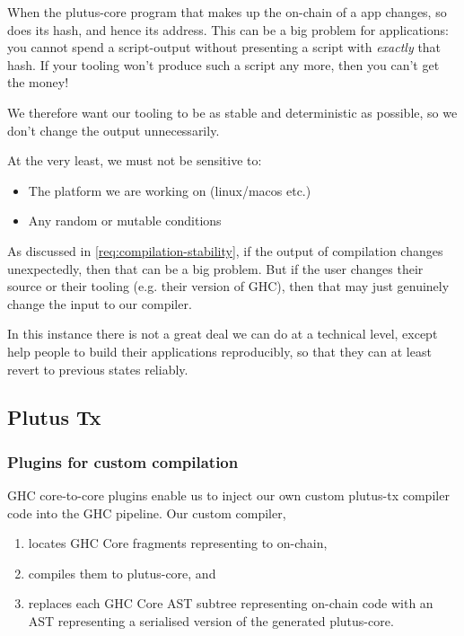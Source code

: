 \begin{requirement}[Stability]
\label{req:compilation-stability}
When the \gls{plutus-core} program that makes up the \gls{on-chain} of a \gls{app} changes, so does its hash, and hence its \gls{address}.
This can be a big problem for applications: you cannot spend a \gls{script-output} without presenting a \gls{script} with \emph{exactly} that hash.
If your tooling won't produce such a \gls{script} any more, then you can't get the money!

We therefore want our tooling to be as stable and deterministic as possible, so we don't change the output unnecessarily.

At the very least, we must not be sensitive to:
\begin{itemize}
\item The platform we are working on (linux/macos etc.)
\item Any random or mutable conditions
\end{itemize}
\end{requirement}

\begin{requirement}
\label{req:compilation-reproducibility}
As discussed in \cref{req:compilation-stability}, if the output of compilation changes unexpectedly, then that can be a big problem.
But if the user changes their source or their tooling (e.g. their version of GHC), then that may just genuinely change the input to our compiler.

In this instance there is not a great deal we can do at a technical level, except help people to build their applications reproducibly, so that
they can at least revert to previous states reliably.
\end{requirement}

\subsection{Plutus Tx}
\label{sec:plutus-tx}

\subsubsection{Plugins for custom compilation}

GHC core-to-core plugins enable us to inject our own custom \gls{plutus-tx} compiler code into the GHC pipeline.
Our custom compiler,
\begin{enumerate}
\item locates GHC Core fragments representing to \gls{on-chain},
\item compiles them to \gls{plutus-core}, and
\item replaces each GHC Core AST subtree representing \gls{on-chain} code with an AST representing a serialised version of the generated \gls{plutus-core}.
\end{enumerate}

